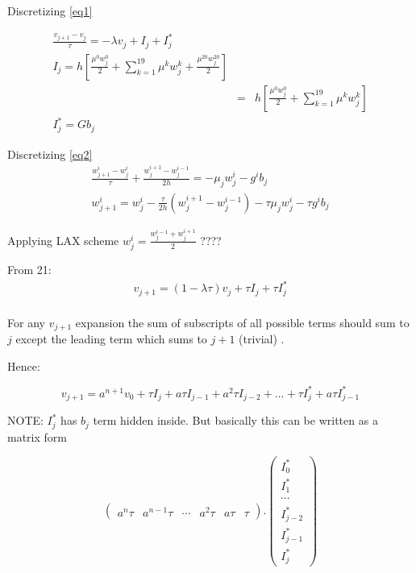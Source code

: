 \documentclass{ifacconf}
\begin{document}
Discretizing \ref{eq1}

\begin{eqnarray}
\frac{v_{j+1}-v_j}{\tau} = -\lambda v_j + I_j + I_j^{*} \\
I_j = h[\frac{\mu^0 w_j^0}{2} + \sum_{k=1}^{19} \mu^k w_j^k + \frac{\mu^{20} w_j^{20}}{2} ] \\
&=&  h[\frac{\mu^0 w_j^0}{2} + \sum_{k=1}^{19} \mu^k w_j^k ] \nonumber \\
I_j^{*} = Gb_j
\end{eqnarray}


Discretizing \ref{eq2}
\begin{eqnarray}
\frac{w_{j+1}^i-w_{j}^i}{\tau} + \frac{w_j^{i+1}-w_j^{i-1}}{2h} = -\mu_jw_j^i - g^ib_j \nonumber\\
w_{j+1}^i=w_{j}^i-\frac{\tau}{2h}(w_j^{i+1}-w_j^{i-1})-\tau\mu_j w_j^i - \tau g^i b_j
\end{eqnarray}

Applying LAX scheme $w_j^i = \frac{w_j^{i-1} + w_j^{i+1}}{2}$ ????


From 21:
\begin{eqnarray}
v_{j+1} = (1-\lambda \tau)v_j + \tau I_j + \tau I_j^{*} \\
\end{eqnarray}


For any $v_{j+1}$ expansion the sum of subscripts of all possible terms should sum to $j$ except the leading term which sums to $j+1$ (trivial) .

Hence:

\begin{equation}
v_{j+1} = a^{n+1}v_0 + \tau I_j + a \tau I_{j-1} + a^2 \tau I_{j-2} + \ldots + \tau I_j^{*} + a\tau I_{j-1}^{*} 
\end{equation}


NOTE: $I_j^{*}$ has $b_j$ term hidden inside. But basically this can be written as a matrix form

\begin{equation}
\begin{pmatrix} a^{n}\tau & a^{n-1}\tau & \cdots & a^2\tau & a\tau& \tau \end{pmatrix} . \begin{pmatrix} I_0^{*} \\ I_1^{*} \\ \cdots \\ I_{j-2}^{*} \\ I_{j-1}^{*} \\ I_{j} ^{*}\end{pmatrix}
\end{equation}
\end{document}
